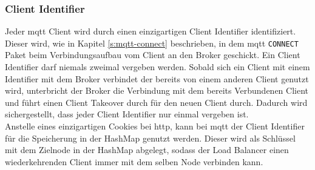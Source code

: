 \subsubsection{Client Identifier}
Jeder \ac{mqtt} Client wird durch einen einzigartigen Client Identifier identifiziert. Dieser wird, wie in Kapitel \ref{s:mqtt-connect} beschrieben, in dem \ac{mqtt} \verb|CONNECT| Paket beim Verbindungsaufbau vom Client an den Broker geschickt. Ein Client Identifier darf niemals zweimal vergeben werden. Sobald sich ein Client mit einem Identifier mit dem Broker verbindet der bereits von einem anderen Client genutzt wird, unterbricht der Broker die Verbindung mit dem bereits Verbundenen Client und führt einen Client Takeover durch für den neuen Client durch. Dadurch wird sichergestellt, dass jeder Client Identifier nur einmal vergeben ist.
\\
Anstelle eines einzigartigen Cookies bei \ac{http}, kann bei \ac{mqtt} der Client Identifier für die Speicherung in der HashMap genutzt werden. Dieser wird als Schlüssel mit dem Zielnode in der HashMap abgelegt, sodass der Load Balancer einen wiederkehrenden Client immer mit dem selben Node verbinden kann.

